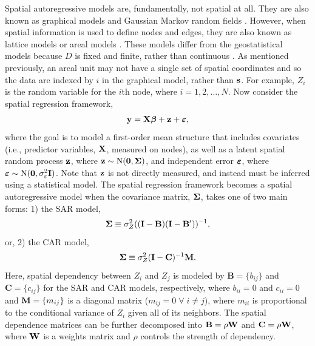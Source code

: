 \documentclass[11pt, titlepage]{article}\usepackage[]{graphicx}\usepackage[]{color}
\begin{document}
Spatial autoregressive models are, fundamentally, not spatial at all. They are also known as graphical models \citep[e.g.,][]{Laur:grap:1996, Whit:grap:2009} and Gaussian Markov random fields \citep[e.g.,][]{Rue:Held:Gaus:2005}. However, when spatial information is used to define nodes and edges, they are also known as lattice models \citep[e.g.,][pg. 8]{Cres:stat:1993} or areal models \citep[e.g.,][pg. 69]{Bane:Carl:Gelf:hier:2004}. These models differ from the geostatistical models because $D$ is fixed and finite, rather than continuous \citep[][pg. 8]{Cres:stat:1993}. As mentioned previously, an areal unit may not have a single set of spatial coordinates and so the data are indexed by $i$ in the graphical model, rather than $\mathbf{s}$. For example, $Z_i$ is the random variable for the $i$th node, where $i = 1, 2, \dots, N$.  
Now consider the spatial regression framework, 
\begin{equation}
  \mathbf{y} = \mathbf{X}\mbox{\boldmath $\beta$} + \mathbf{z}  + \mbox{\boldmath $\varepsilon$},
  \label{eq:ArealFramework}
\end{equation}
where the goal is to model a first-order mean structure that includes covariates (i.e., predictor variables, $\mathbf{X}$, measured on nodes), as well as a latent spatial random process $\mathbf{z}$, where $\mathbf{z} \sim \textrm{N}(\mathbf{0},\mbox{\boldmath $\Sigma$})$, and independent error $\mbox{\boldmath $\varepsilon$}$, where $\mbox{\boldmath $\varepsilon$} \sim \textrm{N}(\mathbf{0},\sigma^2_\varepsilon \mathbf{I})$. Note that $\mathbf{z}$ is not directly measured, and instead must be inferred using a statistical model. The spatial regression framework becomes a spatial autoregressive model when the covariance matrix, $\mbox{\boldmath $\Sigma$}$, takes one of two main forms: 1) the SAR model,
\begin{equation} \label{eq:SARcov}
  \mbox{\boldmath $\Sigma$} \equiv \sigma^2_Z ((\mathbf{I}-\mathbf{B})(\mathbf{I}-\mathbf{B}^{\prime}))^{-1},
\end{equation}
or, 2) the CAR model,
\begin{equation} \label{eq:CARcov}
  \mbox{\boldmath $\Sigma$} \equiv \sigma^2_Z (\mathbf{I}-\mathbf{C})^{-1}\mathbf{M}.
\end{equation}
Here, spatial dependency between $Z_i$ and $Z_j$ is modeled by $\mathbf{B}= \{b_{ij}\}$ and $\mathbf{C} = \{c_{ij}\}$ for the SAR and CAR models, respectively, where $b_{ii} = 0$ and $c_{ii} = 0$ and $\mathbf{M} = \{m_{ij}\}$ is a diagonal matrix ($m_{ij} = 0 \; \forall \; i \neq j$), where $m_{ii}$ is proportional to the conditional variance of $Z_i$ given all of its neighbors. The spatial dependence matrices can be further decomposed into $\mathbf{B} = \rho\mathbf{W}$ and $\mathbf{C} = \rho\mathbf{W}$, where $\mathbf{W}$ is a weights matrix and $\rho$ controls the strength of dependency.
\end{document}
